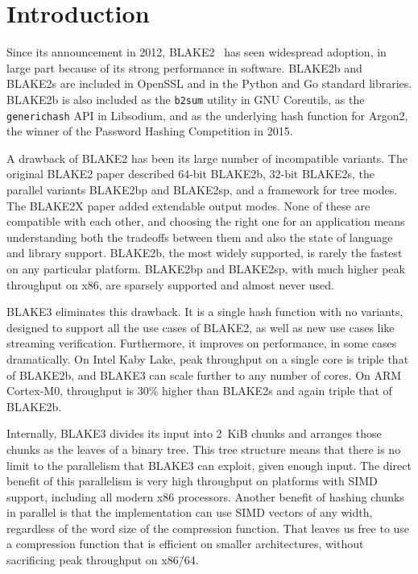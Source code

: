\documentclass[11pt,notitlepage,a4paper]{article}
\begin{document}
\smallskip

\section{Introduction}\label{sec:intro}

Since its announcement in 2012, BLAKE2~\cite{DBLP:conf/acns/AumassonNWW13} has 
seen widespread adoption, in large
part because of its strong performance in software. BLAKE2b and BLAKE2s are
included in OpenSSL and in the Python and Go standard libraries. BLAKE2b is
also included as the \texttt{b2sum} utility in GNU Coreutils, as the
\texttt{generichash} API in Libsodium, and as the underlying hash function for
Argon2, the winner of the Password Hashing Competition in 2015.

A drawback of BLAKE2 has been its large number of incompatible variants. The
original BLAKE2 paper described 64-bit BLAKE2b, 32-bit BLAKE2s, the parallel
variants BLAKE2bp and BLAKE2sp, and a framework for tree modes. The BLAKE2X
paper added extendable output modes. None of these are compatible with each
other, and choosing the right one for an application means understanding both
the tradeoffs between them and also the state of language and library support.
BLAKE2b, the most widely supported, is rarely the fastest on any particular
platform. BLAKE2bp and BLAKE2sp, with much higher peak throughput on x86, are
sparsely supported and almost never used.

BLAKE3 eliminates this drawback. It is a single hash function with no variants,
designed to support all the use cases of BLAKE2, as well as new use cases like
streaming verification. Furthermore, it improves on performance, in some cases
dramatically. On Intel Kaby Lake, peak throughput on a single core is triple
that of BLAKE2b, and BLAKE3 can scale further to any number of cores. On ARM
Cortex-M0, throughput is 30\% higher than BLAKE2s and again triple that of
BLAKE2b.

Internally, BLAKE3 divides its input into 2~KiB chunks and arranges those
chunks as the leaves of a binary tree. This tree structure means that there is
no limit to the parallelism that BLAKE3 can exploit, given enough input. The
direct benefit of this parallelism is very high throughput on platforms with
SIMD support, including all modern x86 processors. Another benefit of hashing
chunks in parallel is that the implementation can use SIMD vectors of any
width, regardless of the word size of the compression function. That leaves us
free to use a compression function that is efficient on smaller architectures,
without sacrificing peak throughput on x86\=/64.
\end{document}
